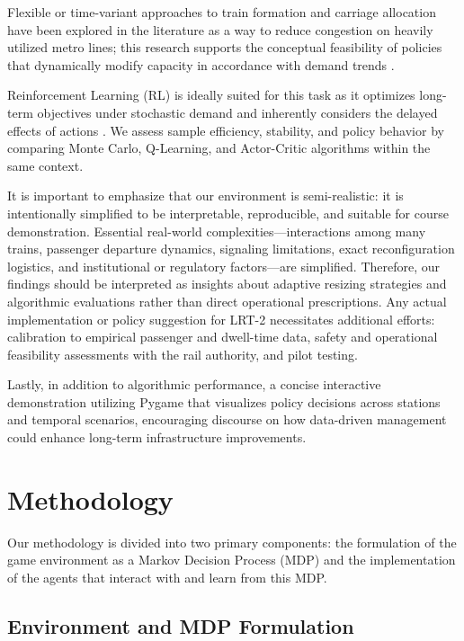 \documentclass{article}
\begin{document}
Flexible or time-variant approaches to train formation and carriage allocation have been explored in the literature as a way to reduce congestion on heavily utilized metro lines; this research supports the conceptual feasibility of policies that dynamically modify capacity in accordance with demand trends \cite{shi}.

Reinforcement Learning (RL) is ideally suited for this task as it optimizes long-term objectives under stochastic demand and inherently considers the delayed effects of actions \cite{lai}. We assess sample efficiency, stability, and policy behavior by comparing Monte Carlo, Q-Learning, and Actor-Critic algorithms within the same context.

It is important to emphasize that our environment is semi-realistic: it is intentionally simplified to be interpretable, reproducible, and suitable for course demonstration. Essential real-world complexities—interactions among many trains, passenger departure dynamics, signaling limitations, exact reconfiguration logistics, and institutional or regulatory factors—are simplified. Therefore, our findings should be interpreted as insights about adaptive resizing strategies and algorithmic evaluations rather than direct operational prescriptions. Any actual implementation or policy suggestion for LRT-2 necessitates additional efforts: calibration to empirical passenger and dwell-time data, safety and operational feasibility assessments with the rail authority, and pilot testing.

Lastly, in addition to algorithmic performance, a concise interactive demonstration utilizing Pygame that visualizes policy decisions across stations and temporal scenarios, encouraging discourse on how data-driven management could enhance long-term infrastructure improvements.

\section{Methodology}

Our methodology is divided into two primary components: the formulation of the game environment as a Markov Decision Process (MDP) and the implementation of the agents that interact with and learn from this MDP.

\subsection{Environment and MDP Formulation}
\end{document}
